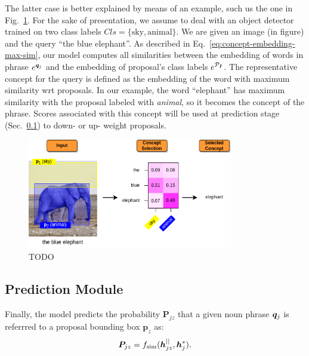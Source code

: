 The latter case is better explained by means of an example, such us
the one in Fig.~\ref{fig:concept-selection-example}. For the sake of
presentation, we assume to deal with an object detector trained on two
class labels $Cls = \{ \text{sky}, \text{animal} \}$. We are given an
image (in figure) and the query ``the blue elephant''. As described in
Eq.~\ref{eq:concept-embedding-max-sim}, our model computes all
similarities between the embedding of words in phrase $e^{\bm{q}_j}$ and the
embedding of proposal's class labels $e^{\mathcal{P}_{\bm{I}}}$. The representative
concept for the query is defined as the embedding of the word with
maximum similarity wrt proposals. In our example, the word
``elephant'' has maximum similarity with the proposal labeled with
\textit{animal}, so it becomes the concept of the phrase. Scores
associated with this concept will be used at prediction stage
(Sec.~\ref{subsec:prediction-module}) to down- or up- weight
proposals.

\begin{figure}
  \centering
  \includegraphics[width=0.8\textwidth]{figures/concept-selection-example.png}
  \caption[Concept selection example]{ TODO }
  \label{fig:concept-selection-example}
\end{figure}

\subsection{Prediction Module}
\label{subsec:prediction-module}

Finally, the model predicts the probability $\bm{P}_{jz}$ that a given
noun phrase $\bm{q}_j$ is referrred to a proposal bounding box $\bm{p}_z$
as:
\begin{equation}
  \bm{P}_{jz} = f_{\text{sim}} ( \bm{h}^{||}_{jz} , \bm{h}^*_j ).
\end{equation}

